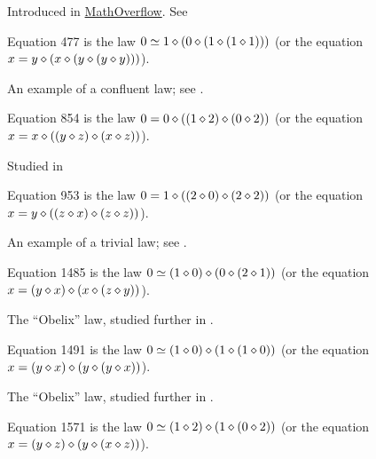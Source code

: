 Introduced in \href{https://mathoverflow.net/a/450905/766}{MathOverflow}. See 

\begin{definition}[Equation 477]\label{eq477}\leanok{}  Equation 477 is the law $0 \simeq 1 \diamond (0 \diamond (1 \diamond (1 \diamond 1)))$ (or the equation $x = y \diamond (x \diamond (y \diamond (y \diamond y)))$).
\end{definition}

An example of a confluent law; see .

\begin{definition}[Equation 854]\label{eq854}\leanok{}  Equation 854 is the law $0 = 0 \diamond ((1 \diamond 2) \diamond (0 \diamond 2))$ (or the equation $x = x \diamond ((y \diamond z) \diamond (x \diamond z))$).
\end{definition}

Studied in 


\begin{definition}[Equation 953]\label{eq953}\leanok{}  Equation 953 is the law $0 = 1 \diamond ((2 \diamond 0) \diamond (2 \diamond 2))$ (or the equation $x = y \diamond ((z \diamond x) \diamond (z \diamond z))$).
\end{definition}

An example of a trivial law; see .

\begin{definition}[Equation 1485]\label{eq1485}\leanok{}  Equation 1485 is the law $0 \simeq  (1 \diamond 0) \diamond (0 \diamond (2 \diamond 1))$ (or the equation $x = (y \diamond x) \diamond (x \diamond (z \diamond y))$).
\end{definition}

The ``Obelix'' law, studied further in .

\begin{definition}[Equation 1491]\label{eq1491}\leanok{}  Equation 1491 is the law $0 \simeq  (1 \diamond 0) \diamond (1 \diamond (1 \diamond 0))$ (or the equation $x = (y \diamond x) \diamond (y \diamond (y \diamond x))$).
\end{definition}

The ``Obelix'' law, studied further in .

\begin{definition}[Equation 1571]\label{eq1571}\leanok{}  Equation 1571 is the law $0 \simeq  (1 \diamond 2) \diamond (1 \diamond (0 \diamond 2))$ (or the equation $x = (y \diamond z) \diamond (y \diamond (x \diamond z))$).
\end{definition}


